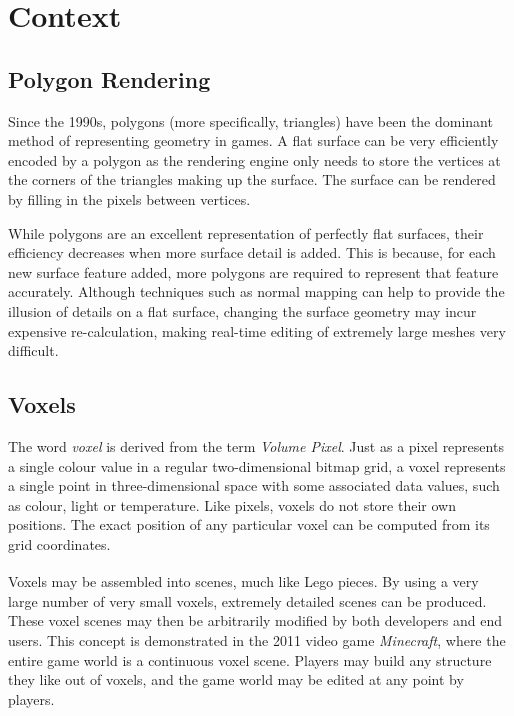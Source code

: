 \section{Context}
\subsection{Polygon Rendering}
Since the 1990s, polygons (more specifically, triangles) have been the dominant method of representing geometry in games. A flat surface can be very efficiently encoded by a polygon as the rendering engine only needs to store the vertices at the corners of the triangles making up the surface. The surface can be rendered by filling in the pixels between vertices.

While polygons are an excellent representation of perfectly flat surfaces, their efficiency decreases when more surface detail is added. This is because, for each new surface feature added, more polygons are required to represent that feature accurately. Although techniques such as normal mapping can help to provide the illusion of details on a flat surface, changing the surface geometry may incur expensive re-calculation, making real-time editing of extremely large meshes very difficult.

\subsection{Voxels}
The word \textit{voxel} is derived from the term \textit{Volume Pixel}. Just as a pixel represents a single colour value in a regular two-dimensional bitmap grid, a voxel represents a single point in three-dimensional space with some associated data values, such as colour, light or temperature. Like pixels, voxels do not store their own positions. The exact position of any particular voxel can be computed from its grid coordinates. 

Voxels may be assembled into scenes, much like  Lego\textsuperscript{\textregistered} pieces. By using a very large number of very small voxels, extremely detailed scenes can be produced. These voxel scenes may then be arbitrarily modified by both developers and end users. This concept is demonstrated in the 2011 video game \textit{Minecraft}, where the entire game world is a continuous voxel scene. Players may build any structure they like out of voxels, and the game world may be edited at any point by players.

